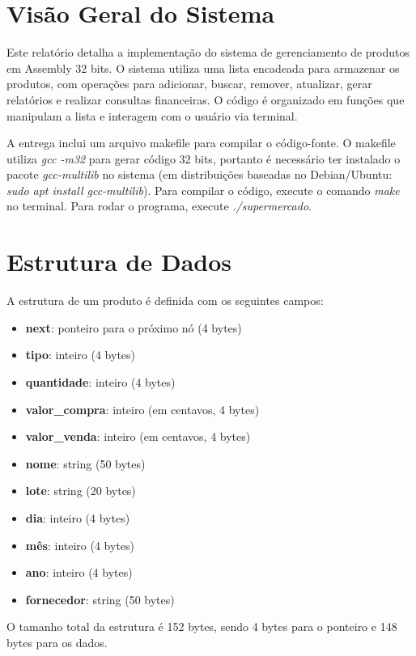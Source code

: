\documentclass[12pt]{article}
\begin{document}


\tableofcontents
\newpage

\section{Visão Geral do Sistema}
Este relatório detalha a implementação do sistema de gerenciamento de produtos em Assembly 32 bits. O sistema utiliza uma lista encadeada para armazenar os produtos, com operações para adicionar, buscar, remover, atualizar, gerar relatórios e realizar consultas financeiras. O código é organizado em funções que manipulam a lista e interagem com o usuário via terminal.

A entrega inclui um arquivo makefile para compilar o código-fonte. O makefile utiliza \textit{gcc -m32} para gerar código 32 bits, portanto é necessário ter instalado o pacote \textit{gcc-multilib} no sistema (em distribuições baseadas no Debian/Ubuntu: \textit{sudo apt install gcc-multilib}). Para compilar o código, execute o comando \textit{make} no terminal. Para rodar o programa, execute \textit{./supermercado}.

\section{Estrutura de Dados}
A estrutura de um produto é definida com os seguintes campos:
\begin{itemize}
    \item \textbf{next}: ponteiro para o próximo nó (4 bytes)
    \item \textbf{tipo}: inteiro (4 bytes)
    \item \textbf{quantidade}: inteiro (4 bytes)
    \item \textbf{valor\_compra}: inteiro (em centavos, 4 bytes)
    \item \textbf{valor\_venda}: inteiro (em centavos, 4 bytes)
    \item \textbf{nome}: string (50 bytes)
    \item \textbf{lote}: string (20 bytes)
    \item \textbf{dia}: inteiro (4 bytes)
    \item \textbf{mês}: inteiro (4 bytes)
    \item \textbf{ano}: inteiro (4 bytes)
    \item \textbf{fornecedor}: string (50 bytes)
\end{itemize}

O tamanho total da estrutura é 152 bytes, sendo 4 bytes para o ponteiro e 148 bytes para os dados.
\end{document}
